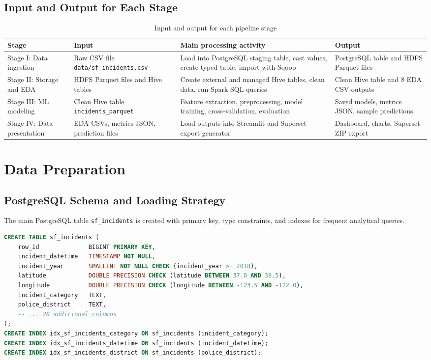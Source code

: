 \documentclass[12pt,a4paper]{article}
\begin{document}
\subsection{Input and Output for Each Stage}

\begin{table}[H]
\centering
\caption{Input and output for each pipeline stage}
\begin{tabular}{L{2.5cm} L{4.7cm} L{4.7cm} L{3.5cm}}
\toprule
\textbf{Stage} & \textbf{Input} & \textbf{Main processing activity} & \textbf{Output} \\
\midrule
Stage I: Data ingestion & Raw CSV file \texttt{data/sf\_incidents.csv} & Load into PostgreSQL staging table, cast values, create typed table, import with Sqoop & PostgreSQL table and HDFS Parquet files \\
Stage II: Storage and EDA & HDFS Parquet files and Hive tables & Create external and managed Hive tables, clean data, run Spark SQL queries & Clean Hive table and 8 EDA CSV outputs \\
Stage III: ML modeling & Clean Hive table \texttt{incidents\_parquet} & Feature extraction, preprocessing, model training, cross-validation, evaluation & Saved models, metrics JSON, sample predictions \\
Stage IV: Data presentation & EDA CSVs, metrics JSON, prediction files & Load outputs into Streamlit and Superset export generator & Dashboard, charts, Superset ZIP export \\
\bottomrule
\end{tabular}
\end{table}

\section{Data Preparation}

\subsection{PostgreSQL Schema and Loading Strategy}

The main PostgreSQL table \texttt{sf\_incidents} is created with primary key, type constraints, and indexes for frequent analytical queries.

\begin{lstlisting}[language=SQL,caption={Main PostgreSQL table DDL}]
CREATE TABLE sf_incidents (
    row_id              BIGINT PRIMARY KEY,
    incident_datetime   TIMESTAMP NOT NULL,
    incident_year       SMALLINT NOT NULL CHECK (incident_year >= 2018),
    latitude            DOUBLE PRECISION CHECK (latitude BETWEEN 37.0 AND 38.5),
    longitude           DOUBLE PRECISION CHECK (longitude BETWEEN -123.5 AND -122.0),
    incident_category   TEXT,
    police_district     TEXT,
    -- ... 28 additional columns
);
CREATE INDEX idx_sf_incidents_category ON sf_incidents (incident_category);
CREATE INDEX idx_sf_incidents_datetime ON sf_incidents (incident_datetime);
CREATE INDEX idx_sf_incidents_district ON sf_incidents (police_district);
\end{lstlisting}
\end{document}
